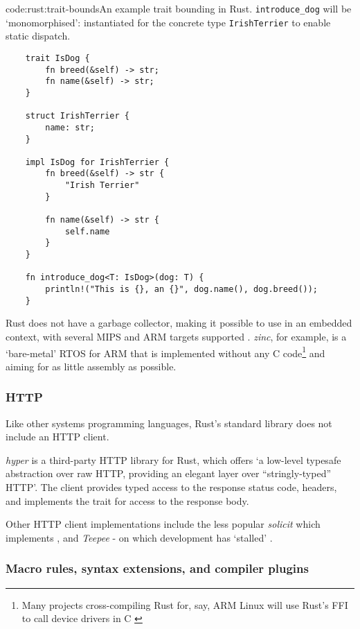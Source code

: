 \begin{codelisting}{code:rust:trait-bounds}{An example trait bounding in Rust. \texttt{introduce_dog} will be `monomorphised': instantiated for the concrete type \texttt{IrishTerrier} to enable static dispatch.}
\begin{verbatim}
	trait IsDog {
		fn breed(&self) -> str;
		fn name(&self) -> str;
	}

	struct IrishTerrier {
		name: str;
	}

	impl IsDog for IrishTerrier {
		fn breed(&self) -> str {
			"Irish Terrier"
		}

		fn name(&self) -> str {
			self.name
		}
	}

	fn introduce_dog<T: IsDog>(dog: T) {
		println!("This is {}, an {}", dog.name(), dog.breed());
	}
\end{verbatim}
\end{codelisting}

Rust does not have a garbage collector, making it possible to use in an embedded context, with several MIPS and ARM targets supported \cite{rust_platforms}. \emph{zinc}, \cite{rust_rtos_zinc} for example, is a `bare-metal' RTOS for ARM that is implemented without any C code\footnote{Many projects cross-compiling Rust for, say, ARM Linux will use Rust's FFI to call device drivers in C \cite{rust_baremetal}} and aiming for as little assembly as possible.

\subsubsection{HTTP}\label{bg:rust:http}
Like other systems programming languages, Rust's standard library does not include an HTTP client.

\emph{hyper} is a third-party HTTP library for Rust, which offers `a low-level typesafe abstraction over raw HTTP, providing an elegant layer over ``stringly-typed'' HTTP'. The client provides typed access to the response status code, headers, and implements the  trait for access to the response body. \cite{rust_http_hyper}

Other HTTP client implementations include the less popular \emph{solicit} \cite{rust_http_solicit} which implements , and \emph{Teepee} - on which development has `stalled' \cite{rust_http_teepee}.

\subsubsection{Macro rules, syntax extensions, and compiler plugins}\label{bg:rust:plugins}

